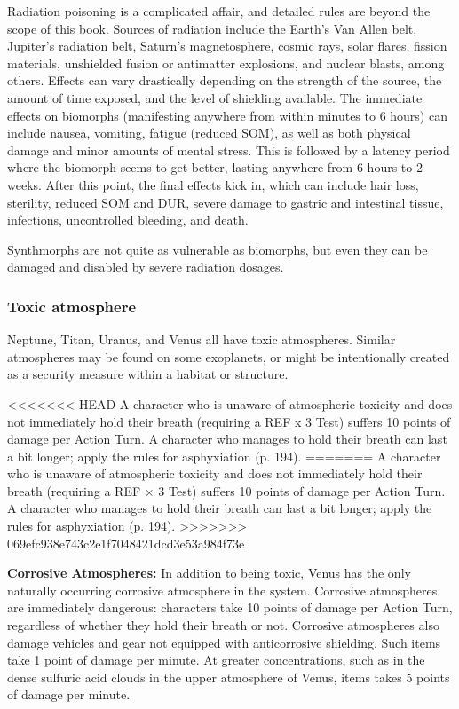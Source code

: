 Radiation poisoning is a complicated affair, and detailed rules are beyond the scope of this book. Sources of radiation include the Earth’s Van Allen belt, Jupiter’s radiation belt, Saturn’s magnetosphere, cosmic rays, solar flares, fission materials, unshielded fusion or antimatter explosions, and nuclear blasts, among others. Effects can vary drastically depending on the strength of the source, the amount of time exposed, and the level of shielding available. The immediate effects on biomorphs (manifesting anywhere from within minutes to 6 hours) can include nausea, vomiting, fatigue (reduced SOM), as well as both physical damage and minor amounts of mental stress. This is followed by a latency period where the biomorph seems to get better, lasting anywhere from 6 hours to 2 weeks. After this point, the final effects kick in, which can include hair loss, sterility, reduced SOM and DUR, severe damage to gastric and intestinal tissue, infections, uncontrolled bleeding, and death. 

Synthmorphs are not quite as vulnerable as biomorphs, but even they can be damaged and disabled by severe radiation dosages. 

\subsubsection{Toxic atmosphere} 

Neptune, Titan, Uranus, and Venus all have toxic atmospheres. Similar atmospheres may be found on some exoplanets, or might be intentionally created as a security measure within a habitat or structure. 

<<<<<<< HEAD A character who is unaware of atmospheric toxicity and does not immediately hold their breath (requiring a REF x 3 Test) suffers 10 points of damage per Action Turn. A character who manages to hold their breath can last a bit longer; apply the rules for asphyxiation (p. 194). ======= A character who is unaware of atmospheric toxicity and does not immediately hold their breath (requiring a REF $\times$ 3 Test) suffers 10 points of damage per Action Turn. A character who manages to hold their breath can last a bit longer; apply the rules for asphyxiation (p. 194). >>>>>>> 069efc938e743c2e1f7048421dcd3e53a984f73e 

\textbf{Corrosive Atmospheres:} In addition to being toxic, Venus has the only naturally occurring corrosive atmosphere in the system. Corrosive atmospheres are immediately dangerous: characters take 10 points of damage per Action Turn, regardless of whether they hold their breath or not. Corrosive atmospheres also damage vehicles and gear not equipped with anticorrosive shielding. Such items take 1 point of damage per minute. At greater concentrations, such as in the dense sulfuric acid clouds in the upper atmosphere of Venus, items takes 5 points of damage per minute. 

